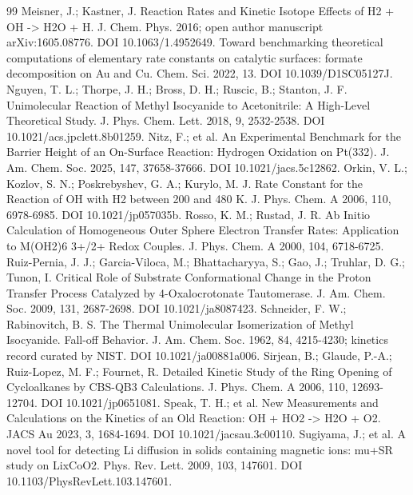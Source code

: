 \begin{thebibliography}{99}
 Meisner, J.; Kastner, J. Reaction Rates and Kinetic Isotope Effects of H2 + OH -> H2O + H. J. Chem. Phys. 2016; open author manuscript arXiv:1605.08776. DOI 10.1063/1.4952649.
 Toward benchmarking theoretical computations of elementary rate constants on catalytic surfaces: formate decomposition on Au and Cu. Chem. Sci. 2022, 13. DOI 10.1039/D1SC05127J.
 Nguyen, T. L.; Thorpe, J. H.; Bross, D. H.; Ruscic, B.; Stanton, J. F. Unimolecular Reaction of Methyl Isocyanide to Acetonitrile: A High-Level Theoretical Study. J. Phys. Chem. Lett. 2018, 9, 2532-2538. DOI 10.1021/acs.jpclett.8b01259.
 Nitz, F.; et al. An Experimental Benchmark for the Barrier Height of an On-Surface Reaction: Hydrogen Oxidation on Pt(332). J. Am. Chem. Soc. 2025, 147, 37658-37666. DOI 10.1021/jacs.5c12862.
 Orkin, V. L.; Kozlov, S. N.; Poskrebyshev, G. A.; Kurylo, M. J. Rate Constant for the Reaction of OH with H2 between 200 and 480 K. J. Phys. Chem. A 2006, 110, 6978-6985. DOI 10.1021/jp057035b.
 Rosso, K. M.; Rustad, J. R. Ab Initio Calculation of Homogeneous Outer Sphere Electron Transfer Rates: Application to M(OH2)6 3+/2+ Redox Couples. J. Phys. Chem. A 2000, 104, 6718-6725.
 Ruiz-Pernia, J. J.; Garcia-Viloca, M.; Bhattacharyya, S.; Gao, J.; Truhlar, D. G.; Tunon, I. Critical Role of Substrate Conformational Change in the Proton Transfer Process Catalyzed by 4-Oxalocrotonate Tautomerase. J. Am. Chem. Soc. 2009, 131, 2687-2698. DOI 10.1021/ja8087423.
 Schneider, F. W.; Rabinovitch, B. S. The Thermal Unimolecular Isomerization of Methyl Isocyanide. Fall-off Behavior. J. Am. Chem. Soc. 1962, 84, 4215-4230; kinetics record curated by NIST. DOI 10.1021/ja00881a006.
 Sirjean, B.; Glaude, P.-A.; Ruiz-Lopez, M. F.; Fournet, R. Detailed Kinetic Study of the Ring Opening of Cycloalkanes by CBS-QB3 Calculations. J. Phys. Chem. A 2006, 110, 12693-12704. DOI 10.1021/jp0651081.
 Speak, T. H.; et al. New Measurements and Calculations on the Kinetics of an Old Reaction: OH + HO2 -> H2O + O2. JACS Au 2023, 3, 1684-1694. DOI 10.1021/jacsau.3c00110.
 Sugiyama, J.; et al. A novel tool for detecting Li diffusion in solids containing magnetic ions: mu+SR study on LixCoO2. Phys. Rev. Lett. 2009, 103, 147601. DOI 10.1103/PhysRevLett.103.147601.

\end{thebibliography}
